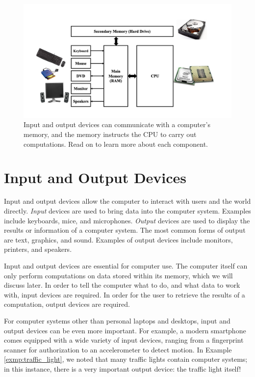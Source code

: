 \begin{figure}
	\centering
	\includegraphics[width=\textwidth]{images/cs_intro_hardware_overview.png}
	\caption{Input and output devices can communicate with a computer's memory, and the memory instructs the CPU to carry out computations. Read on to learn more about each component.
                 }
	\label{fig:hardware:overview}
\end{figure}

\section{Input and Output Devices}

Input and output  devices allow the computer to interact with users and the world directly.  \emph{Input} devices are used to bring data into the computer system. Examples include keyboards, mice, and microphones. \emph{Output} devices are used to display the results or information of a computer system. The most common forms of output are text, graphics, and sound. Examples of output devices include monitors, printers, and speakers. 

Input and output devices are essential for computer use. The computer itself can only perform computations on data stored within its memory, which we will discuss later. In order to tell the computer what to do, and what data to work with, input devices are required. In order for the user to retrieve the results of a computation, output devices are required.

For computer systems other than personal laptops and desktops, input and output devices can be even more important. For example, a modern smartphone comes equipped with a wide variety of input devices, ranging from a fingerprint scanner for authorization to an accelerometer to detect motion. In Example \ref{exmp:traffic_light}, we noted that many traffic lights contain computer systems; in this instance, there is a very important output device: the traffic light itself!

